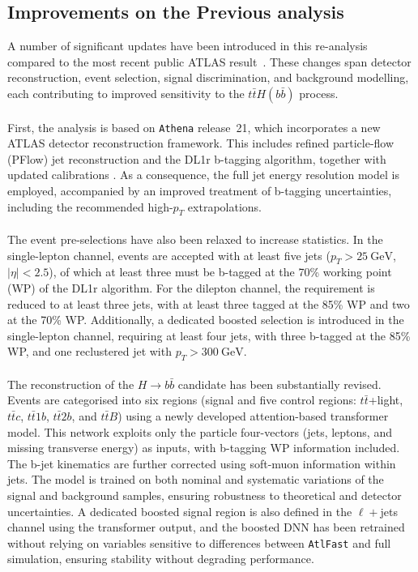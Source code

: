 \subsection{Improvements on the Previous analysis}
A number of significant updates have been introduced in this re-analysis compared to the most recent public ATLAS result~\cite{tth-atlas-2018}. These changes span detector reconstruction, event selection, signal discrimination, and background modelling, each contributing to improved sensitivity to the $t\bar{t}H(b\bar{b})$ process.\\
\\
First, the analysis is based on \texttt{Athena} release~21, which incorporates a new ATLAS detector reconstruction framework. This includes refined particle-flow (PFlow) jet reconstruction and the DL1r b-tagging algorithm, together with updated calibrations \cite{DL1}. As a consequence, the full jet energy resolution model is employed, accompanied by an improved treatment of b-tagging uncertainties, including the recommended high-$p_{T}$ extrapolations. \\
\\
The event pre-selections have also been relaxed to increase statistics. In the single-lepton channel, events are accepted with at least five jets ($p_{T}>25~\text{GeV}$, $|\eta|<2.5$), of which at least three must be b-tagged at the 70\% working point (WP) of the DL1r algorithm. For the dilepton channel, the requirement is reduced to at least three jets, with at least three tagged at the 85\% WP and two at the 70\% WP. Additionally, a dedicated boosted selection is introduced in the single-lepton channel, requiring at least four jets, with three b-tagged at the 85\% WP, and one reclustered jet with $p_{T}>300~\text{GeV}$.\\
\\
The reconstruction of the $H \to b\bar{b}$ candidate has been substantially revised. Events are categorised into six regions (signal and five control regions: $t\bar{t}$+light, $t\bar{t}c$, $t\bar{t}1b$, $t\bar{t}2b$, and $t\bar{t}B$) using a newly developed attention-based transformer model. This network exploits only the particle four-vectors (jets, leptons, and missing transverse energy) as inputs, with b-tagging WP information included. The b-jet kinematics are further corrected using soft-muon information within jets. The model is trained on both nominal and systematic variations of the signal and background samples, ensuring robustness to theoretical and detector uncertainties. A dedicated boosted signal region is also defined in the $\ell+$jets channel using the transformer output, and the boosted DNN has been retrained without relying on variables sensitive to differences between \texttt{AtlFast} and full simulation, ensuring stability without degrading performance.\\

